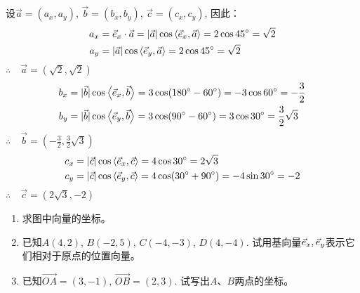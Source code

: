 \begin{solution}
设$\vec{a}=(a_x,a_y)$, $\vec{b}=(b_x,b_y)$, $\vec{c}=(c_x,c_y)$, 因此：
\[\begin{split}
a_x&=\vec{e}_x\cdot \vec{a}=|\vec{a}|\cos\left\langle \vec{e}_x,\vec{a} \right\rangle=2\cos 45^{\circ}=\sqrt{2}\\
a_y&=|\vec{a}|\cos\left\langle \vec{e}_y,\vec{a} \right\rangle=2\cos 45^{\circ}=\sqrt{2}\\
\end{split}\]
$\therefore\quad \vec{a}=\left(\sqrt{2},\sqrt{2}\right)$
\[\begin{split}
    b_x&=|\vec{b}|\cos\left\langle \vec{e}_x,\vec{b} \right\rangle=3\cos (180^{\circ}-60^{\circ})=-3\cos 60^{\circ}=-\dfrac{3}{2}\\
b_y&=|\vec{b}|\cos\left\langle \vec{e}_y,\vec{b} \right\rangle=3\cos (90^{\circ}-60^{\circ})=3\cos30^{\circ}=\dfrac{3}{2}\sqrt{3}\\
\end{split}\]
$\therefore\quad \vec{b}=\left(-\frac{3}{2},\frac{3}{2}\sqrt{3}\right)$
\[\begin{split}
c_x&=|\vec{c}|\cos\left\langle \vec{e}_x,\vec{c} \right\rangle=4\cos 30^{\circ}=2\sqrt{3}\\
c_y&=|\vec{c}|\cos\left\langle \vec{e}_y,\vec{c} \right\rangle=4\cos (30^{\circ}+90^{\circ})=-4\sin 30^{\circ}=-2\\
\end{split}\]
$\therefore\quad \vec{c}=\left(2\sqrt{3},-2\right)$
\end{solution}

\begin{ex}
\begin{enumerate}
    \item 求图中向量的坐标。
    \item 已知$A(4, 2)$, $B(-2, 5)$, $C(-4,-3)$, $D(4,-4)$. 试用基向量$\vec{e}_x,\vec{e}_y$表示它们相对于原点的位置向量。
    \item 已知$\Vec{OA}=(3,-1)$, $\Vec{OB}=(2, 3)$. 试写出$A$、$B$两点的坐标。
\end{enumerate}
\end{ex}

